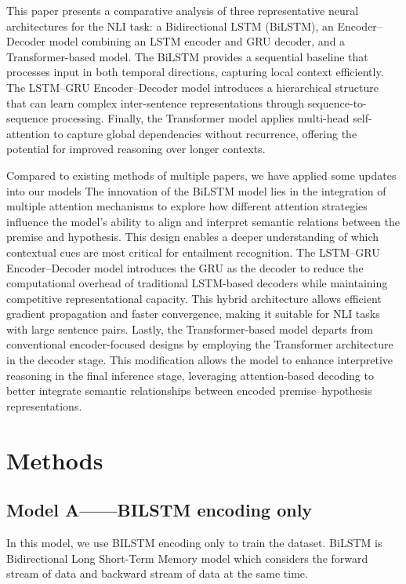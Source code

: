 \documentclass[11pt]{article}
\begin{document}
This paper presents a comparative analysis of three representative neural architectures for the NLI task: a Bidirectional LSTM (BiLSTM), an Encoder–Decoder model combining an LSTM encoder and GRU decoder, and a Transformer-based model. The BiLSTM provides a sequential baseline that processes input in both temporal directions, capturing local context efficiently. The LSTM–GRU Encoder–Decoder model introduces a hierarchical structure that can learn complex inter-sentence representations through sequence-to-sequence processing. Finally, the Transformer model applies multi-head self-attention to capture global dependencies without recurrence, offering the potential for improved reasoning over longer contexts.

Compared to existing methods of multiple papers, we have applied some updates into our models
The innovation of the BiLSTM model lies in the integration of multiple attention mechanisms to explore how different attention strategies influence the model’s ability to align and interpret semantic relations between the premise and hypothesis. This design enables a deeper understanding of which contextual cues are most critical for entailment recognition.
The LSTM–GRU Encoder–Decoder model introduces the GRU as the decoder to reduce the computational overhead of traditional LSTM-based decoders while maintaining competitive representational capacity. This hybrid architecture allows efficient gradient propagation and faster convergence, making it suitable for NLI tasks with large sentence pairs.
Lastly, the Transformer-based model departs from conventional encoder-focused designs by employing the Transformer architecture in the decoder stage. This modification allows the model to enhance interpretive reasoning in the final inference stage, leveraging attention-based decoding to better integrate semantic relationships between encoded premise–hypothesis representations.


\section{Methods}
\subsection{Model A——BILSTM encoding only}
In this model, we use BILSTM encoding only to train the dataset. BiLSTM is Bidirectional Long Short-Term Memory model which considers the forward stream of data and backward stream of data at the same time.
\end{document}
